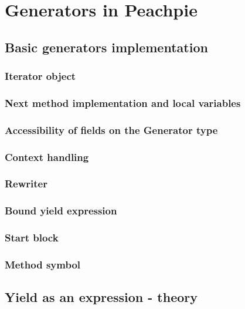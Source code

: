\chapter{Generators in Peachpie}

\section{Basic generators implementation}

\subsection{Iterator object}

\subsection{Next method implementation and local variables}

\subsection{Accessibility of fields on the Generator type}

\subsection{Context handling}

\subsection{Rewriter}

\subsection{Bound yield expression}

\subsection{Start block}

\subsection{Method symbol}

\section{Yield as an expression - theory}

